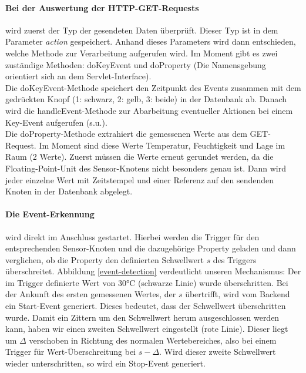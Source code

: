 \documentclass[12pt,a4paper,twoside]{article}
\begin{document}
\paragraph{Bei der Auswertung der HTTP-GET-Requests} wird zuerst der Typ der gesendeten Daten überprüft. Dieser Typ ist in dem Parameter \textit{action} gespeichert. Anhand dieses Parameters wird dann entschieden, welche Methode zur Verarbeitung aufgerufen wird. Im Moment gibt es zwei zuständige Methoden: doKeyEvent und doProperty (Die Namensgebung orientiert sich an dem Servlet-Interface).\\
Die doKeyEvent-Methode speichert den Zeitpunkt des Events zusammen mit dem gedrückten Knopf (1: schwarz, 2: gelb, 3: beide) in der Datenbank ab. Danach wird die handleEvent-Methode zur Abarbeitung eventueller Aktionen bei einem Key-Event aufgerufen (s.u.). \\
Die doProperty-Methode extrahiert die gemessenen Werte aus dem GET-Request. Im Moment sind diese Werte Temperatur, Feuchtigkeit und Lage im Raum (2 Werte). Zuerst müssen die Werte erneut gerundet werden, da die Floating-Point-Unit des Sensor-Knotens nicht besonders genau ist. Dann wird jeder einzelne Wert mit Zeitstempel und einer Referenz auf den sendenden Knoten in der Datenbank abgelegt. 

\paragraph{Die Event-Erkennung} wird direkt im Anschluss gestartet. Hierbei werden die Trigger für den entsprechenden Sensor-Knoten und die dazugehörige Property geladen und dann verglichen, ob die Property den definierten Schwellwert $s$ des Triggers überschreitet. Abbildung \ref{event-detection} verdeutlicht unseren Mechanismus: Der im Trigger definierte Wert von 30°C (schwarze Linie) wurde überschritten. Bei der Ankunft des ersten gemessenen Wertes, der $s$ übertrifft, wird vom Backend ein Start-Event generiert. Dieses bedeutet, dass der Schwellwert überschritten wurde. Damit ein Zittern um den Schwellwert herum ausgeschlossen werden kann, haben wir einen zweiten Schwellwert eingestellt (rote Linie). Dieser liegt um $\Delta$ verschoben in Richtung des normalen Wertebereiches, also bei einem Trigger für Wert-Überschreitung bei $s - \Delta$.
Wird dieser zweite Schwellwert wieder unterschritten, so wird ein Stop-Event generiert. 
\end{document}

